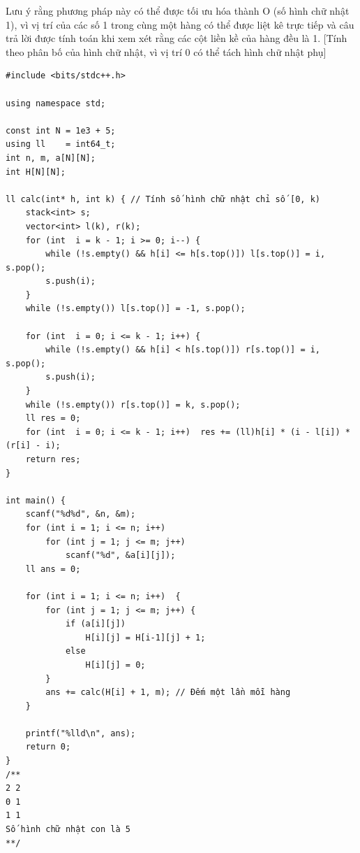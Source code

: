 \par \noindent Lưu ý rằng phương pháp này có thể được tối ưu hóa thành O (số hình chữ nhật 1), vì vị trí của các số 1 trong cùng một hàng có thể được liệt kê trực tiếp và câu trả lời được tính toán khi xem xét rằng các cột liền kề của hàng đều là 1. [Tính theo phân bố của hình chữ nhật, vì vị trí 0 có thể tách hình chữ nhật phụ]

\begin{verbatim}
#include <bits/stdc++.h>

using namespace std;

const int N = 1e3 + 5;
using ll    = int64_t;
int n, m, a[N][N];
int H[N][N]; 

ll calc(int* h, int k) { // Tính số hình chữ nhật chỉ số [0, k)
    stack<int> s;
    vector<int> l(k), r(k);
    for (int  i = k - 1; i >= 0; i--) {
        while (!s.empty() && h[i] <= h[s.top()]) l[s.top()] = i, s.pop();
        s.push(i);
    }
    while (!s.empty()) l[s.top()] = -1, s.pop();
    
    for (int  i = 0; i <= k - 1; i++) {
        while (!s.empty() && h[i] < h[s.top()]) r[s.top()] = i, s.pop();
        s.push(i);
    }
    while (!s.empty()) r[s.top()] = k, s.pop();
    ll res = 0;
    for (int  i = 0; i <= k - 1; i++)  res += (ll)h[i] * (i - l[i]) * (r[i] - i);
    return res;
}

int main() {
    scanf("%d%d", &n, &m);
    for (int i = 1; i <= n; i++) 
        for (int j = 1; j <= m; j++) 
            scanf("%d", &a[i][j]);
    ll ans = 0;
    
    for (int i = 1; i <= n; i++)  {
        for (int j = 1; j <= m; j++) {
            if (a[i][j])
                H[i][j] = H[i-1][j] + 1;
            else
                H[i][j] = 0;
        }
        ans += calc(H[i] + 1, m); // Đếm một lần mỗi hàng
    }
    
    printf("%lld\n", ans);
    return 0;
}
/**
2 2
0 1
1 1 
Số hình chữ nhật con là 5
**/
\end{verbatim}